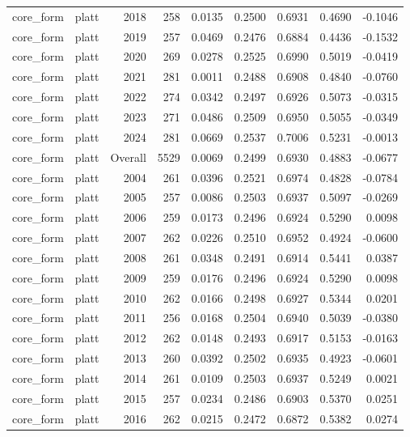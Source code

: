 \begin{table}[t]
\begin{tabular}{@{} l l r r r r r r r @{} }
      core\_form & platt & 2018 & 258 & 0.0135 & 0.2500 & 0.6931 & 0.4690 & -0.1046 \\
      core\_form & platt & 2019 & 257 & 0.0469 & 0.2476 & 0.6884 & 0.4436 & -0.1532 \\
      core\_form & platt & 2020 & 269 & 0.0278 & 0.2525 & 0.6990 & 0.5019 & -0.0419 \\
      core\_form & platt & 2021 & 281 & 0.0011 & 0.2488 & 0.6908 & 0.4840 & -0.0760 \\
      core\_form & platt & 2022 & 274 & 0.0342 & 0.2497 & 0.6926 & 0.5073 & -0.0315 \\
      core\_form & platt & 2023 & 271 & 0.0486 & 0.2509 & 0.6950 & 0.5055 & -0.0349 \\
      core\_form & platt & 2024 & 281 & 0.0669 & 0.2537 & 0.7006 & 0.5231 & -0.0013 \\
      core\_form & platt & Overall & 5529 & 0.0069 & 0.2499 & 0.6930 & 0.4883 & -0.0677 \\
      core\_form & platt & 2004 & 261 & 0.0396 & 0.2521 & 0.6974 & 0.4828 & -0.0784 \\
      core\_form & platt & 2005 & 257 & 0.0086 & 0.2503 & 0.6937 & 0.5097 & -0.0269 \\
      core\_form & platt & 2006 & 259 & 0.0173 & 0.2496 & 0.6924 & 0.5290 & 0.0098 \\
      core\_form & platt & 2007 & 262 & 0.0226 & 0.2510 & 0.6952 & 0.4924 & -0.0600 \\
      core\_form & platt & 2008 & 261 & 0.0348 & 0.2491 & 0.6914 & 0.5441 & 0.0387 \\
      core\_form & platt & 2009 & 259 & 0.0176 & 0.2496 & 0.6924 & 0.5290 & 0.0098 \\
      core\_form & platt & 2010 & 262 & 0.0166 & 0.2498 & 0.6927 & 0.5344 & 0.0201 \\
      core\_form & platt & 2011 & 256 & 0.0168 & 0.2504 & 0.6940 & 0.5039 & -0.0380 \\
      core\_form & platt & 2012 & 262 & 0.0148 & 0.2493 & 0.6917 & 0.5153 & -0.0163 \\
      core\_form & platt & 2013 & 260 & 0.0392 & 0.2502 & 0.6935 & 0.4923 & -0.0601 \\
      core\_form & platt & 2014 & 261 & 0.0109 & 0.2503 & 0.6937 & 0.5249 & 0.0021 \\
      core\_form & platt & 2015 & 257 & 0.0234 & 0.2486 & 0.6903 & 0.5370 & 0.0251 \\
      core\_form & platt & 2016 & 262 & 0.0215 & 0.2472 & 0.6872 & 0.5382 & 0.0274 \\

\end{tabular}
\end{table}

